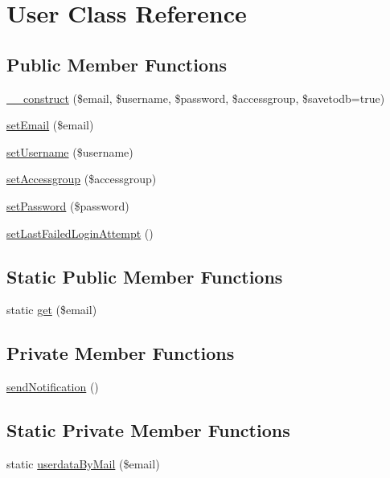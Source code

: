 \hypertarget{a00049}{}\section{User Class Reference}
\label{a00049}
\subsection*{Public Member Functions}
\begin{DoxyCompactItemize}
\item 
\hyperlink{a00049_aca1bf51a5efba9e3b88c66d12b081a2b}{\+\_\+\+\_\+construct} (\$email, \$username, \$password, \$accessgroup, \$savetodb=true)
\item 
\hyperlink{a00049_a5ef76eef42d2624386442eeb636d338c}{set\+Email} (\$email)
\item 
\hyperlink{a00049_ac359b701a2ccaff746dd480f03314244}{set\+Username} (\$username)
\item 
\hyperlink{a00049_a930ab29fc6ab2cd66840a92a7056bf53}{set\+Accessgroup} (\$accessgroup)
\item 
\hyperlink{a00049_a3e35c8d3dbb2c513c618a664389e0926}{set\+Password} (\$password)
\item 
\hyperlink{a00049_ac94366e9b326c8dc53449ddf1e7e1ecd}{set\+Last\+Failed\+Login\+Attempt} ()
\end{DoxyCompactItemize}
\subsection*{Static Public Member Functions}
\begin{DoxyCompactItemize}
\item 
static \hyperlink{a00049_a736a049fef923075462ba5a2b9d66b3e}{get} (\$email)
\end{DoxyCompactItemize}
\subsection*{Private Member Functions}
\begin{DoxyCompactItemize}
\item 
\hyperlink{a00049_a9cf3a655861ad4b52feb5e69692066f3}{send\+Notification} ()
\end{DoxyCompactItemize}
\subsection*{Static Private Member Functions}
\begin{DoxyCompactItemize}
\item 
static \hyperlink{a00049_ac1e9c733679a192eae351365ac8eac2c}{userdata\+By\+Mail} (\$email)
\end{DoxyCompactItemize}


